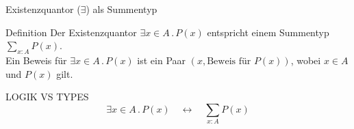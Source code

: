 \documentclass{beamer}
\begin{document}
\begin{frame}{Existenzquantor (\(\exists\)) als Summentyp}
    \begin{block}{Definition}
        Der Existenzquantor \( \exists x \in A \, . \, P(x) \) entspricht einem Summentyp \( \sum_{x : A} P(x) \). \\
        Ein Beweis für \( \exists x \in A \, . \, P(x) \) ist ein Paar \((x, \text{Beweis für } P(x))\), wobei \( x \in A \) und \( P(x) \) gilt.
    \end{block}

    \begin{block}{LOGIK VS TYPES}
        \[
        \exists x \in A \, . \, P(x) \quad \leftrightarrow \quad \sum_{x : A} P(x)
        \]
    \end{block}

\end{frame}
\end{document}
